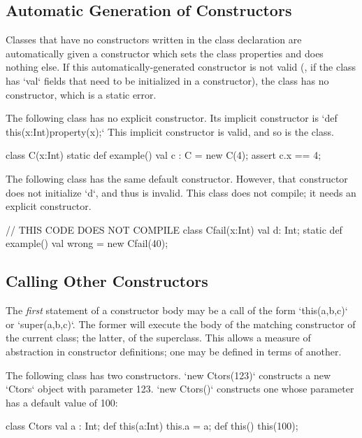 \subsection{Automatic Generation of Constructors}

Classes that have no constructors written in the class declaration are
automatically given a constructor which sets the class properties and does
nothing else. If this automatically-generated constructor is not valid (\eg,
if the class has \xcd`val` fields that need to be initialized in a
constructor), the class has no constructor, which is a static error.

\begin{ex}
The following class has no explicit constructor.
Its implicit constructor is 
\xcd`def this(x:Int){property(x);}`
This implicit constructor is valid, and so is the class. 
\begin{xten}
class C(x:Int) {
  static def example() {
    val c : C = new C(4);
    assert c.x == 4;
  }
}
\end{xten}
%
\noindent 


The following class has the same default constructor.  However, that
constructor does not initialize \xcd`d`, and thus is invalid.  This 
class does not compile; it needs an explicit constructor.
\begin{xten}
// THIS CODE DOES NOT COMPILE
class Cfail(x:Int) {
  val d: Int;
  static def example() {
    val wrong = new Cfail(40);
  }
}
\end{xten}
%


\end{ex}

\subsection{Calling Other Constructors}

The {\em first} statement of a constructor body may be a call of the form 
\xcd`this(a,b,c)` or \xcd`super(a,b,c)`.  The former will execute the body of
the matching constructor of the current class; the latter, of the superclass. 
This allows a measure of abstraction in constructor definitions; one may be
defined in terms of another.

\begin{ex}
The following class has two constructors.  \xcd`new Ctors(123)` constructs a
new \xcd`Ctors` object with parameter 123.  \xcd`new Ctors()` constructs one
whose parameter has a default value of 100: 
\begin{xten}
class Ctors {
  val a : Int;
  def this(a:Int) { this.a = a; }
  def this() {
    this(100);
  }
}
\end{xten}
%
\end{ex}

